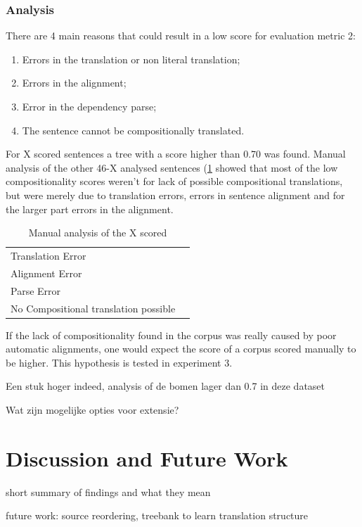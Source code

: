 \documentclass{report}
\theoremstyle{indented}
\begin{document}
\subsection{Analysis}

There are 4 main reasons that could result in a low score for evaluation metric 2:
\begin{enumerate}
\item Errors in the translation or non literal translation;
\item Errors in the alignment;
\item Error in the dependency parse;
\item The sentence cannot be compositionally translated.
\end{enumerate}

For X scored sentences a tree with a score higher than 0.70 was found. Manual analysis of the other 46-X analysed sentences (\ref{tab:class} showed that most of the low compositionality scores weren't for lack of possible compositional translations, but were merely due to translation errors, errors in sentence alignment and for the larger part errors in the alignment.

\begin{table}[!h]\label{tab:class}
\begin{tabular}{|l|l|}
\hline
Translation Error & \\
Alignment Error & \\
Parse Error &\\
No Compositional translation possible & \\
\hline
\end{tabular}
\caption{Manual analysis of the X scored}
\end{table}

If the lack of compositionality found in the corpus was really caused by poor automatic alignments, one would expect the score of a corpus scored manually to be higher. This hypothesis is tested in experiment 3.

Een stuk hoger indeed, analysis of de bomen lager dan 0.7 in deze dataset

Wat zijn mogelijke opties voor extensie?

\chapter{Discussion and Future Work}

short summary of findings and what they mean

future work: source reordering, treebank to learn translation structure
\end{document}
